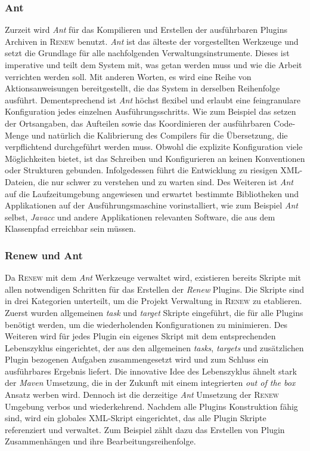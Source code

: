 		\subsubsection{Ant}	%
		Zurzeit wird \textit{Ant} für das Kompilieren und Erstellen der ausführbaren Plugins Archiven in \textsc{Renew} benutzt. \textit{Ant} ist das älteste der vorgestellten Werkzeuge und setzt die Grundlage für alle nachfolgenden Verwaltungsinstrumente. Dieses ist imperative und teilt dem System mit, was getan werden muss und wie die Arbeit verrichten werden soll. Mit anderen Worten, es wird eine Reihe von Aktionsanweisungen bereitgestellt, die das System in derselben Reihenfolge ausführt. Dementsprechend ist \textit{Ant} höchst flexibel und erlaubt eine feingranulare Konfiguration jedes einzelnen Ausführungsschritts. Wie zum Beispiel das setzen der Ortsangaben, das Aufteilen sowie das Koordinieren der ausführbaren Code-Menge und natürlich die Kalibrierung des Compilers für die Übersetzung, die verpflichtend durchgeführt werden muss.\newline 
		Obwohl die explizite Konfiguration viele Möglichkeiten bietet, ist das Schreiben und Konfigurieren an keinen Konventionen oder Strukturen gebunden. Infolgedessen führt die Entwicklung zu riesigen XML-Dateien, die nur schwer zu verstehen und zu warten sind. Des Weiteren ist \textit{Ant} auf die Laufzeitumgebung angewiesen und erwartet bestimmte Bibliotheken und Applikationen auf der Ausführungsmaschine vorinstalliert, wie zum Beispiel \textit{Ant} selbst, \textit{Javacc} und andere Applikationen relevanten Software, die aus dem Klassenpfad erreichbar sein müssen. 

		\subsubsection{Renew und Ant} %
		Da \textsc{Renew} mit dem \textit{Ant} Werkzeuge verwaltet wird, existieren bereits Skripte mit allen notwendigen Schritten für das Erstellen der \textit{Renew} Plugins. Die Skripte sind in drei Kategorien unterteilt, um die Projekt Verwaltung in \textsc{Renew} zu etablieren. Zuerst wurden allgemeinen \textit{task} und \textit{target} Skripte eingeführt, die für alle Plugins benötigt werden, um die wiederholenden Konfigurationen zu minimieren. Des Weiteren wird für jedes Plugin ein eigenes Skript mit dem entsprechenden Lebenszyklus eingerichtet, der aus den allgemeinen \textit{tasks}, \textit{targets} und zusätzlichen Plugin bezogenen Aufgaben zusammengesetzt wird und zum Schluss ein ausführbares Ergebnis liefert. Die innovative Idee des Lebenszyklus ähnelt stark der \textit{Maven} Umsetzung, die in der Zukunft mit einem integrierten \textit{out of the box} Ansatz werben wird. Dennoch ist die derzeitige \textit{Ant} Umsetzung der \textsc{Renew} Umgebung verbos und wiederkehrend. \newline
		Nachdem alle Plugins Konstruktion fähig sind, wird ein globales XML-Skript eingerichtet, das alle Plugin Skripte referenziert und verwaltet. Zum Beispiel zählt dazu das Erstellen von Plugin Zusammenhängen und ihre Bearbeitungsreihenfolge.
		
